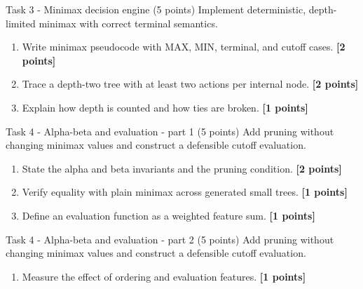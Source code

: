 \documentclass[aspectratio=169,11pt]{beamer}
\begin{document}
\begin{frame}{Task 3 - Minimax decision engine (5 points)}
\small
Implement deterministic, depth-limited minimax with correct terminal semantics.

\vspace{0.2cm}
\begin{enumerate}
\item[\textbf{a.}] Write minimax pseudocode with MAX, MIN, terminal, and cutoff cases. \hfill{\color{courseblue}\textbf{[2 points]}}
\item[\textbf{b.}] Trace a depth-two tree with at least two actions per internal node. \hfill{\color{courseblue}\textbf{[2 points]}}
\item[\textbf{c.}] Explain how depth is counted and how ties are broken. \hfill{\color{courseblue}\textbf{[1 points]}}
\end{enumerate}
\end{frame}

\begin{frame}{Task 4 - Alpha-beta and evaluation - part 1 (5 points)}
\small
Add pruning without changing minimax values and construct a defensible cutoff evaluation.

\vspace{0.2cm}
\begin{enumerate}
\item[\textbf{a.}] State the alpha and beta invariants and the pruning condition. \hfill{\color{courseblue}\textbf{[2 points]}}
\item[\textbf{b.}] Verify equality with plain minimax across generated small trees. \hfill{\color{courseblue}\textbf{[1 points]}}
\item[\textbf{c.}] Define an evaluation function as a weighted feature sum. \hfill{\color{courseblue}\textbf{[1 points]}}
\end{enumerate}
\end{frame}

\begin{frame}{Task 4 - Alpha-beta and evaluation - part 2 (5 points)}
\small
Add pruning without changing minimax values and construct a defensible cutoff evaluation.

\vspace{0.2cm}
\begin{enumerate}
\item[\textbf{d.}] Measure the effect of ordering and evaluation features. \hfill{\color{courseblue}\textbf{[1 points]}}
\end{enumerate}
\end{frame}
\end{document}
